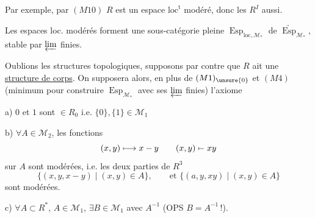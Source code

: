 Par exemple, par $(M10)$ $R$ est un espace $\mathrm{loc}^{\mathrm t}$ modéré, donc les $R^I$ aussi.

Les espaces loc. modérés  forment une sous-catégorie pleine $\operatorname{Esp}_{\mathrm{loc},\mathcal M_*}$ de $\underrightarrow{\operatorname{Esp}}_{\mathcal M_*}$, stable par $\varprojlim$ finies.


Oublions les structures topologiques, supposons par contre que $R$ ait une \uline{structure de corps}. On supposera alors,  en plus de $(M1)_{\unsure{0}}$ et $(M4)$ (minimum pour construire $\operatorname{Esp}_{\mathcal M_*}$ avec ses $\varprojlim$ finies) l'axiome


a) $0$ et $1$ sont $\in R_0$ i.e. $\{0\},\{1\}\in\mathcal M_1$

b) $\forall A\in\mathcal M_2$, les fonctions
\[
 (x,y)\longmapsto x-y\qquad
 (x,y)\mathrel{\mapstochar\relbar}xy
\]
sur $A$ sont modérées,  i.e. les deux parties de $R^3$
\[
 \{(x,y,x-y)\mid(x,y)\in A\},\qquad\text{et }\{(a,y,xy)\mid(x,y)\in A\}
\]
sont modérées.

c) $\forall A\subset R^*$, $A\in\mathcal M_1$, $\exists B\in\mathcal M_1$ avec $A^{-1}$  (OPS $B=A^{-1}$\,!).

